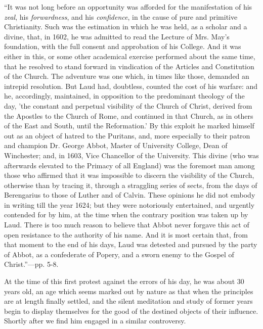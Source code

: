 ``It was not long before an
opportunity was afforded for the manifestation of his \emph{zeal}, his \emph{forwardness},
and his \emph{confidence}, in the cause of pure and primitive
Christianity. Such was the estimation in which he was held, as a scholar
and a divine, that, in 1602, he was admitted to read the Lecture of Mrs.
May's foundation, with the full consent and approbation of his College.
And it was either in this, or some other academical exercise performed
about the same time, that he resolved to stand forward in vindication of
the Articles and Constitution of the Church. The adventure was one
which, in times like those, demanded an intrepid resolution. But Laud
had, doubtless, counted the cost of his warfare: and he, accordingly,
maintained, in opposition to the predominant theology of the day, 'the
constant and perpetual visibility of the Church of Christ, derived from
the Apostles to the Church of Rome, and continued in that Church, as in
others of the East and South, until the Reformation.' By this exploit he
marked himself out as an object of hatred to the Puritans, and, more
especially to their patron and champion Dr. George Abbot, Master of
University College, Dean of Winchester; and, in 1603, Vice Chancellor of
the University. This divine (who was afterwards elevated to the Primacy
of all England) was the foremost man among those who affirmed that it
was impossible to discern the visibility of the Church, otherwise than
by tracing it, through a straggling series of sects, from the days of
Berengarius to those of Luther and of Calvin. These opinions he did not
embody in writing till the year 1624; but they were notoriously
entertained, and urgently contended for by him, at the time when the
contrary position was taken up by Laud. There is too much reason to
believe that Abbot never forgave this act of open resistance to the
authority of his name. And it is most certain that, from that moment to
the end of his days, Laud was detested and pursued by the party of
Abbot, as a confederate of Popery, and a sworn enemy to the Gospel of
Christ.''—pp. 5-8.

At the time of this first protest against the
errors of his day, he was about 30 years old, an age which seems marked
out by nature as that when the principles are at length finally settled,
and the silent meditation and study of former years begin to display
themselves for the good of the destined objects of their influence.
Shortly after we find him engaged in a similar controversy.

